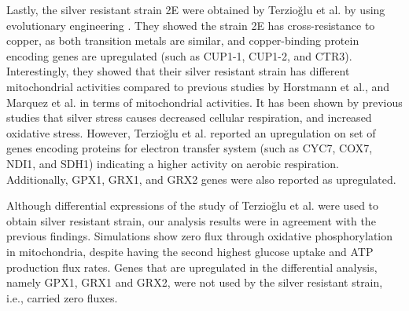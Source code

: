 Lastly, the silver resistant strain 2E were obtained by Terzioğlu et al. by using evolutionary engineering \cite{terziouglu2020genomic}. They showed the strain 2E has cross-resistance to copper, as both transition metals are similar, and copper-binding protein encoding genes are upregulated (such as CUP1-1, CUP1-2, and CTR3). Interestingly, they showed that their silver resistant strain has different mitochondrial activities compared to previous studies by Horstmann et al.\cite{horstmann2019transcriptome}, and Marquez et al. \cite{galvan2018zinc} in terms of mitochondrial activities. It has been shown by previous studies that silver stress causes decreased cellular respiration, and increased oxidative stress. However, Terzioğlu et al. reported an upregulation on set of genes encoding proteins for electron transfer system (such as CYC7, COX7, NDI1, and SDH1) indicating a higher activity on aerobic respiration. Additionally, GPX1, GRX1, and GRX2 genes were also reported as upregulated.

Although differential expressions of the study of Terzioğlu et al. were used to obtain silver resistant strain, our analysis results were in agreement with the previous findings. Simulations show zero flux through oxidative phosphorylation in mitochondria, despite having the second highest glucose uptake and ATP production flux rates. Genes that are upregulated in the differential analysis, namely GPX1, GRX1 and GRX2, were not used by the silver resistant strain, i.e., carried zero fluxes.
